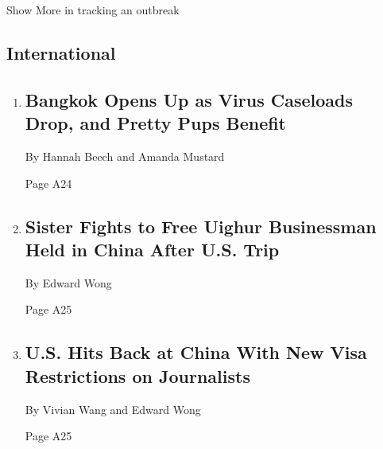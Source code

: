 Show More in tracking an outbreak

\hypertarget{international}{%
\subsection{International}\label{international}}

\begin{enumerate}
\def\labelenumi{\arabic{enumi}.}
\item
  \href{/2020/05/10/world/asia/bangkok-coronavirus-pet-salons-dogs.html}{}

  \hypertarget{bangkok-opens-up-as-virus-caseloads-drop-and-pretty-pups-benefit-1}{%
  \subsection{Bangkok Opens Up as Virus Caseloads Drop, and Pretty Pups
  Benefit}\label{bangkok-opens-up-as-virus-caseloads-drop-and-pretty-pups-benefit-1}}

  By Hannah Beech and Amanda Mustard

  Page A24
\item
  \href{/2020/05/09/us/politics/china-uighurs-arrest.html}{}

  \hypertarget{sister-fights-to-free-uighur-businessman-held-in-china-after-us-trip-1}{%
  \subsection{Sister Fights to Free Uighur Businessman Held in China
  After U.S.
  Trip}\label{sister-fights-to-free-uighur-businessman-held-in-china-after-us-trip-1}}

  By Edward Wong

  Page A25
\item
  \href{/2020/05/09/us/politics/china-journalists-us-visa-crackdown.html}{}

  \hypertarget{us-hits-back-at-china-with-new-visa-restrictions-on-journalists}{%
  \subsection{U.S. Hits Back at China With New Visa Restrictions on
  Journalists}\label{us-hits-back-at-china-with-new-visa-restrictions-on-journalists}}

  By Vivian Wang and Edward Wong

  Page A25
\end{enumerate}

